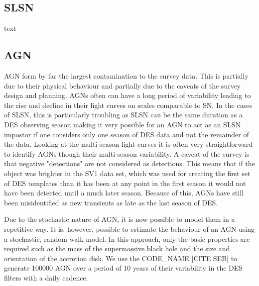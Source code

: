 \begin{figure}
  \caption{}
  \label{fig:IIDist}
\end{figure}

\subsection{SLSN}
text

\subsection{AGN}
AGN form by far the largest contamination to the survey data. This is partially due to their physical behaviour and partially due to the caveats of the survey design and planning. AGNs often can have a long period of variability leading to the rise and decline in their light curves on scales comparable to SN. In the cases of SLSN, this is particularly troubling as SLSN can be the same duration as a DES observing season making it very possible for an AGN to act as an SLSN impostor if one considers only one season of DES data and not the remainder of the data. Looking at the multi-season light curves it is often very straightforward to identify AGNs though their multi-season variability. A caveat of the survey is that negative "detections" are not considered as detections. This means that if the object was brighter in the SV1 data set, which was used for creating the first set of DES templates than it has been at any point in the first season it would not have been detected until a much later season. Because of this, AGNs have still been misidentified as new transients as late as the last season of DES.

Due to the stochastic nature of AGN, it is now possible to model them in a repetitive way. It is, however, possible to estimate the behaviour of an AGN using a stochastic, random walk model. In this approach, only the basic properties are required such as the mass of the supermassive black hole and the size and orientation of the accretion disk. We use the CODE\_NAME [CITE SEB] to generate 100000 AGN over a period of 10 years of their variability in the DES filters with a daily cadence.

